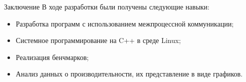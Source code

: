 \documentclass{beamer}
\begin{document}
\begin{frame}{Заключение}
  В ходе разработки были получены следующие навыки:
    \begin{itemize}
      \item Разработка программ с использованием межпроцессной коммуникации;
      \item Системное программирование на C++ в среде Linux;
      \item Реализация бенчмарков;
	  \item Анализ данных о производительности, их представление в виде
			графиков.
    \end{itemize}
\end{frame}
\end{document}
